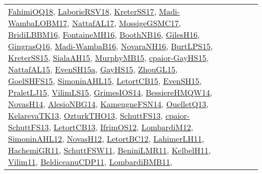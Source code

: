 {\begin{longtable}{lp{3cm}>{\raggedright}p{6cm}>{\raggedright}p{6cm}p{8cm}}
\href{articles/FahimiOQ18.pdf}{FahimiOQ18}\cite{FahimiOQ18}, \href{articles/LaborieRSV18.pdf}{LaborieRSV18}\cite{LaborieRSV18}, \href{articles/KreterSS17.pdf}{KreterSS17}\cite{KreterSS17}, \href{papers/Madi-WambaLOBM17.pdf}{Madi-WambaLOBM17}\cite{Madi-WambaLOBM17}, \href{articles/NattafAL17.pdf}{NattafAL17}\cite{NattafAL17}, \href{papers/MossigeGSMC17.pdf}{MossigeGSMC17}\cite{MossigeGSMC17}, \href{papers/BridiLBBM16.pdf}{BridiLBBM16}\cite{BridiLBBM16}, \href{papers/FontaineMH16.pdf}{FontaineMH16}\cite{FontaineMH16}, \href{papers/BoothNB16.pdf}{BoothNB16}\cite{BoothNB16}, \href{papers/GilesH16.pdf}{GilesH16}\cite{GilesH16}, \href{papers/GingrasQ16.pdf}{GingrasQ16}\cite{GingrasQ16}, \href{papers/Madi-WambaB16.pdf}{Madi-WambaB16}\cite{Madi-WambaB16}, \href{articles/NovaraNH16.pdf}{NovaraNH16}\cite{NovaraNH16}, \href{papers/BurtLPS15.pdf}{BurtLPS15}\cite{BurtLPS15}, \href{papers/KreterSS15.pdf}{KreterSS15}\cite{KreterSS15}, \href{papers/SialaAH15.pdf}{SialaAH15}\cite{SialaAH15}, \href{papers/MurphyMB15.pdf}{MurphyMB15}\cite{MurphyMB15}, \href{papers/cpaior-GayHS15.pdf}{cpaior-GayHS15}\cite{cpaior-GayHS15}, \href{articles/NattafAL15.pdf}{NattafAL15}\cite{NattafAL15}, \href{articles/EvenSH15a.pdf}{EvenSH15a}\cite{EvenSH15a}, \href{papers/GayHS15.pdf}{GayHS15}\cite{GayHS15}, \href{papers/ZhouGL15.pdf}{ZhouGL15}\cite{ZhouGL15}, \href{articles/GoelSHFS15.pdf}{GoelSHFS15}\cite{GoelSHFS15}, \href{articles/SimoninAHL15.pdf}{SimoninAHL15}\cite{SimoninAHL15}, \href{articles/LetortCB15.pdf}{LetortCB15}\cite{LetortCB15}, \href{papers/EvenSH15.pdf}{EvenSH15}\cite{EvenSH15}, \href{papers/PraletLJ15.pdf}{PraletLJ15}\cite{PraletLJ15}, \href{papers/VilimLS15.pdf}{VilimLS15}\cite{VilimLS15}, \href{articles/GrimesIOS14.pdf}{GrimesIOS14}\cite{GrimesIOS14}, \href{papers/BessiereHMQW14.pdf}{BessiereHMQW14}\cite{BessiereHMQW14}, \href{articles/NovasH14.pdf}{NovasH14}\cite{NovasH14}, \href{papers/AlesioNBG14.pdf}{AlesioNBG14}\cite{AlesioNBG14}, \href{articles/KameugneFSN14.pdf}{KameugneFSN14}\cite{KameugneFSN14}, \href{papers/OuelletQ13.pdf}{OuelletQ13}\cite{OuelletQ13}, \href{papers/KelarevaTK13.pdf}{KelarevaTK13}\cite{KelarevaTK13}, \href{articles/OzturkTHO13.pdf}{OzturkTHO13}\cite{OzturkTHO13}, \href{papers/SchuttFS13.pdf}{SchuttFS13}\cite{SchuttFS13}, \href{papers/cpaior-SchuttFS13.pdf}{cpaior-SchuttFS13}\cite{cpaior-SchuttFS13}, \href{papers/LetortCB13.pdf}{LetortCB13}\cite{LetortCB13}, \href{papers/IfrimOS12.pdf}{IfrimOS12}\cite{IfrimOS12}, \href{articles/LombardiM12.pdf}{LombardiM12}\cite{LombardiM12}, \href{papers/SimoninAHL12.pdf}{SimoninAHL12}\cite{SimoninAHL12}, \href{articles/NovasH12.pdf}{NovasH12}\cite{NovasH12}, \href{papers/LetortBC12.pdf}{LetortBC12}\cite{LetortBC12}, \href{papers/LahimerLH11.pdf}{LahimerLH11}\cite{LahimerLH11}, \href{articles/HachemiGR11.pdf}{HachemiGR11}\cite{HachemiGR11}, \href{articles/SchuttFSW11.pdf}{SchuttFSW11}\cite{SchuttFSW11}, \href{articles/BeniniLMR11.pdf}{BeniniLMR11}\cite{BeniniLMR11}, \href{articles/KelbelH11.pdf}{KelbelH11}\cite{KelbelH11}, \href{papers/Vilim11.pdf}{Vilim11}\cite{Vilim11}, \href{articles/BeldiceanuCDP11.pdf}{BeldiceanuCDP11}\cite{BeldiceanuCDP11}, \href{papers/LombardiBMB11.pdf}{LombardiBMB11}\cite{LombardiBMB11}, 
\end{longtable}}
